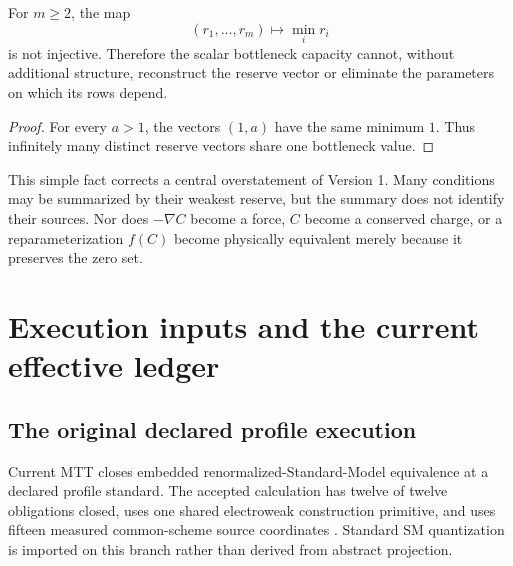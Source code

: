 \documentclass[11pt]{article}
\begin{document}
\begin{proposition}
\label{prop:min-not-injective}
For \(m\geq2\), the map
\[
(r_1,\ldots,r_m)\longmapsto \min_i r_i
\]
is not injective. Therefore the scalar bottleneck capacity cannot, without
additional structure, reconstruct the reserve vector or eliminate the
parameters on which its rows depend.
\end{proposition}

\begin{proof}
For every \(a>1\), the vectors \((1,a)\) have the same minimum \(1\).
Thus infinitely many distinct reserve vectors share one bottleneck value.
\end{proof}

This simple fact corrects a central overstatement of Version 1. Many
conditions may be summarized by their weakest reserve, but the summary does
not identify their sources. Nor does \(-\nabla C\) become a force, \(C\)
become a conserved charge, or a reparameterization \(f(C)\) become physically
equivalent merely because it preserves the zero set.

\section{Execution inputs and the current effective ledger}

\subsection{The original declared profile execution}

Current MTT closes embedded renormalized-Standard-Model equivalence at a
declared profile standard. The accepted calculation has twelve of twelve
obligations closed, uses one shared electroweak construction primitive, and
uses fifteen measured common-scheme source coordinates
\cite{MTTSuperset2026,MTTRoadmap2026}. Standard SM quantization is imported
on this branch rather than derived from abstract projection.
\end{document}
